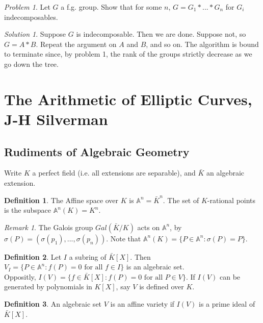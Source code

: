 \documentclass[11pt]{article}
\theoremstyle{definition}
\newtheorem{definition}{Definition}[section]
\theoremstyle{example}
\theoremstyle{remark}
\newtheorem{remark}{Remark}[section]
\theoremstyle{lemma}
\theoremstyle{proposition}
\theoremstyle{Problem}
\newtheorem{problem}{Problem}[section]
\theoremstyle{Solution}
\newtheorem{solution}{Solution}[section]
\theoremstyle{theorem}
\begin{document}
\begin{problem}
Let $G$ a f.g. group. Show that for some $n$, $G=G_1*...*G_n$ for $G_i$ indecomposables.
\end{problem}
\begin{solution}
Suppose $G$ is indecomposable. Then we are done. Suppose not, so $G = A*B$. Repeat the argument on $A$ and $B$, and so on. The algorithm is bound to terminate since, by problem 1, the rank of the groups strictly decrease as we go down the tree.
\end{solution}



\section{The Arithmetic of Elliptic Curves, J-H Silverman}
\subsection{Rudiments of Algebraic Geometry}
Write $K$ a perfect field (i.e. all extensions are separable), and $\bar{K}$ an algebraic extension.
\begin{definition}
The Affine space over $K$ is $\mathbb{A}^n = \bar{K}^n$. The set of $K$-rational points is the subspace $\mathbb{A}^n(K) = K^n$.
\end{definition}
\begin{remark}
The Galois group $Gal(\bar{K}/K)$ acts on $\mathbb{A}^n$, by $\sigma(P) = (\sigma(p_1), ..., \sigma(p_n))$. Note that $\mathbb{A}^n(K) = \{P\in \mathbb{A}^n : \sigma(P) = P\}$.
\end{remark}
\begin{definition}
Let $I$ a subring of $\bar{K}[X]$. Then $V_I = \{P\in\mathbb{A}^n : f(P) = 0 \text{ for all } f\in I\}$ is an algebraic set.\\
Oppositly, $I(V) = \{f\in \bar{K}[X] : f(P) = 0 \text{ for all } P\in V\}$. If $I(V)$ can be generated by polynomials in $K[X]$, say $V$ is defined over $K$.
\end{definition}

\begin{definition}
An algebraic set $V$ is an affine variety if $I(V)$ is a prime ideal of $\bar{K}[X]$.
\end{definition}
\end{document}
